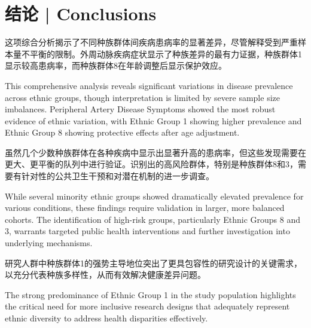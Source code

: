 \documentclass[12pt,a4paper]{article}
\begin{document}
\section{结论 | Conclusions}

这项综合分析揭示了不同种族群体间疾病患病率的显著差异，尽管解释受到严重样本量不平衡的限制。外周动脉疾病症状显示了种族差异的最有力证据，种族群体1显示较高患病率，而种族群体8在年龄调整后显示保护效应。

This comprehensive analysis reveals significant variations in disease prevalence across ethnic groups, though interpretation is limited by severe sample size imbalances. Peripheral Artery Disease Symptoms showed the most robust evidence of ethnic variation, with Ethnic Group 1 showing higher prevalence and Ethnic Group 8 showing protective effects after age adjustment.

虽然几个少数种族群体在各种疾病中显示出显著升高的患病率，但这些发现需要在更大、更平衡的队列中进行验证。识别出的高风险群体，特别是种族群体8和3，需要有针对性的公共卫生干预和对潜在机制的进一步调查。

While several minority ethnic groups showed dramatically elevated prevalence for various conditions, these findings require validation in larger, more balanced cohorts. The identification of high-risk groups, particularly Ethnic Groups 8 and 3, warrants targeted public health interventions and further investigation into underlying mechanisms.

研究人群中种族群体1的强势主导地位突出了更具包容性的研究设计的关键需求，以充分代表种族多样性，从而有效解决健康差异问题。

The strong predominance of Ethnic Group 1 in the study population highlights the critical need for more inclusive research designs that adequately represent ethnic diversity to address health disparities effectively.

\vspace{1cm}
\end{document}
